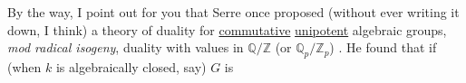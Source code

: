 By the way, I point out for you that Serre once proposed (without ever
writing it down, I think) a theory of duality for \uline{commutative} \uline{unipotent}
algebraic groups, \textit{mod radical isogeny}, duality with values in $\mathbb{Q}/\mathbb{Z}$ (or
$\mathbb{Q}_p/\mathbb{Z}_p$) . He found that if (when $k$ is algebraically closed, say) $G$ is

